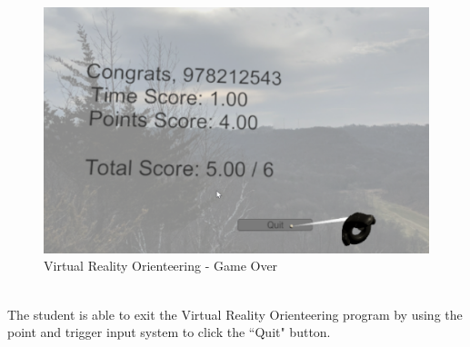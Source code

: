 \begin{figure}[htb]
	\centering
	\includegraphics[width=.6\textwidth]{Requirements/assets/vr-game-over.png}
	\caption[Virtual Reality Orienteering - Game Over]{\label{VR Game Over}Virtual Reality Orienteering - Game Over}
\end{figure} 
\\
The student is able to exit the Virtual Reality Orienteering program by using the point and trigger input system to click the ``Quit" button.